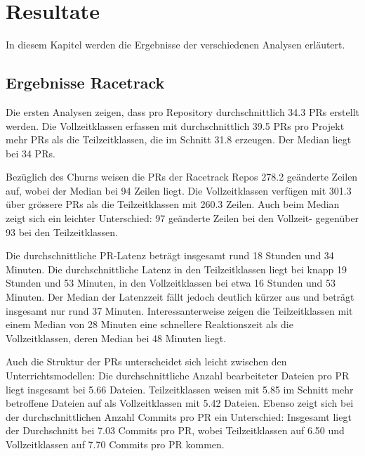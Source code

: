 


\chapter{Resultate} %

\label{Chapter4} %

In diesem Kapitel werden die Ergebnisse der verschiedenen Analysen erläutert.
\section{Ergebnisse Racetrack}
Die ersten Analysen zeigen, dass pro Repository durchschnittlich 34.3 PRs erstellt werden. Die Vollzeitklassen erfassen mit durchschnittlich 39.5 PRs pro Projekt mehr PRs als die Teilzeitklassen, die im Schnitt 31.8 erzeugen. Der Median liegt bei 34 PRs.

Bezüglich des Churns weisen die PRs der Racetrack Repos 278.2 geänderte Zeilen auf, wobei der Median bei 94 Zeilen liegt. Die Vollzeitklassen verfügen mit 301.3 über grössere PRs als die Teilzeitklassen mit 260.3 Zeilen. Auch beim Median zeigt sich ein leichter Unterschied: 97 geänderte Zeilen bei den Vollzeit- gegenüber 93 bei den Teilzeitklassen. 

Die durchschnittliche PR-Latenz beträgt insgesamt rund 18 Stunden und 34 Minuten. Die durchschnittliche Latenz in den Teilzeitklassen liegt bei knapp 19 Stunden und 53 Minuten, in den Vollzeitklassen bei etwa 16 Stunden und 53 Minuten. Der Median der Latenzzeit fällt jedoch deutlich kürzer aus und beträgt insgesamt nur rund 37 Minuten. Interessanterweise zeigen die Teilzeitklassen mit einem Median von 28 Minuten eine schnellere Reaktionszeit als die Vollzeitklassen, deren Median bei 48 Minuten liegt.

Auch die Struktur der PRs unterscheidet sich leicht zwischen den Unterrichtsmodellen: Die durchschnittliche Anzahl bearbeiteter Dateien pro PR liegt insgesamt bei 5.66 Dateien. Teilzeitklassen weisen mit 5.85 im Schnitt mehr betroffene Dateien auf als Vollzeitklassen mit 5.42 Dateien. Ebenso zeigt sich bei der durchschnittlichen Anzahl Commits pro PR ein Unterschied: Insgesamt liegt der Durchschnitt bei 7.03 Commits pro PR, wobei Teilzeitklassen auf 6.50 und Vollzeitklassen auf 7.70 Commits pro PR kommen.

